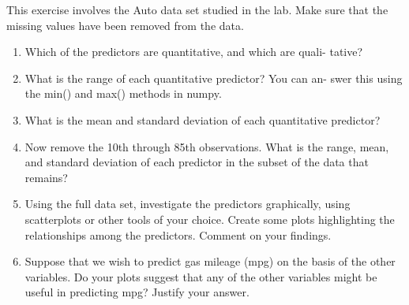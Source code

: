 \begin{exercise}[2.9]
	This exercise involves the Auto data set studied in the lab. Make sure
	that the missing values have been removed from the data.
	\begin{enumerate}[label=(\alph*)]
		\item Which of the predictors are quantitative, and which are quali-
		tative?
		\item  What is the range of each quantitative predictor? You can an-
		swer this using the min() and max() methods in numpy.
		\item What is the mean and standard deviation of each quantitative
		predictor?
		\item  Now remove the 10th through 85th observations. What is the
		range, mean, and standard deviation of each predictor in the
		subset of the data that remains?
		\item Using the full data set, investigate the predictors graphically,
		using scatterplots or other tools of your choice. Create some plots
		highlighting the relationships among the predictors. Comment
		on your findings.
		\item  Suppose that we wish to predict gas mileage (mpg) on the basis
		of the other variables. Do your plots suggest that any of the
		other variables might be useful in predicting mpg? Justify your
		answer.
		
	\end{enumerate}
\end{exercise}
